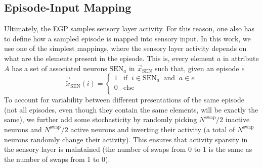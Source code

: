 \documentclass{article}
\begin{document}
\subsection*{Episode-Input Mapping}
Ultimately, the EGP samples sensory layer activity. For this reason, one also has to define how a sampled episode is mapped into sensory input. In this work, we use one of the simplest mappings, where the sensory layer activity depends on what are the elements present in the episode. This is, every element $a$ in attribute $A$ has a set of associated neurons $\textrm{SEN}_a$ in $\vec{x}_\textrm{SEN}$ such that, given an episode $e$
\[     \vec{\tilde{x}}_\textrm{SEN}(i) = \begin{cases} 
      1 & \textrm{if} \;\; i \in \textrm{SEN}_a \;\;\textrm{and}\;\; a \in e\\ 
      0 & \textrm{else} \\
   \end{cases}
\]
To account for variability between different presentations of the same episode (not all episodes, even though they contain the same elements, will be exactly the same), we further add some stochasticity by randomly picking $N^\textrm{swap}/2$ inactive neurons and $N^\textrm{swap}/2$ active neurons and inverting their activity (a total of $N^\textrm{swap}$ neurons randomly change their activity). This ensures that activity sparsity in the sensory layer is maintained (the number of swaps from 0 to 1 is the same as the number of swaps from 1 to 0).
\end{document}
